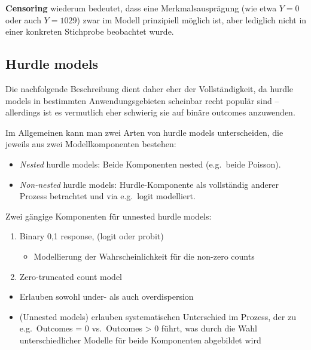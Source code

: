 \documentclass[ngerman,a4paper,]{scrartcl}
\providecommand{\tightlist}{%
  \setlength{\itemsep}{0pt}\setlength{\parskip}{0pt}}
\theoremstyle{definition}
\theoremstyle{definition}
\theoremstyle{definition}
\theoremstyle{remark}
\begin{document}
\textbf{Censoring} wiederum bedeutet, dass eine Merkmalsausprägung (wie etwa \(Y = 0\) oder auch \(Y = 1029\)) zwar im Modell prinzipiell möglich ist, aber lediglich nicht in einer konkreten Stichprobe beobachtet wurde.

\hypertarget{mod-hurdle}{%
\subsection{Hurdle models}\label{mod-hurdle}}

Die nachfolgende Beschreibung dient daher eher der Vollständigkeit, da hurdle models in bestimmten Anwendungsgebieten scheinbar recht populär sind -- allerdings ist es vermutlich eher schwierig sie auf binäre outcomes anzuwenden.

Im Allgemeinen kann man zwei Arten von hurdle models unterscheiden, die jeweils aus zwei Modellkomponenten bestehen:

\begin{itemize}
\tightlist
\item
  \emph{Nested} hurdle models: Beide Komponenten nested (e.g.~beide Poisson).
\item
  \emph{Non-nested} hurdle models: Hurdle-Komponente als vollständig anderer Prozess betrachtet und via e.g.~logit modelliert.
\end{itemize}

Zwei gängige Komponenten für unnested hurdle models:

\begin{enumerate}
\def\labelenumi{\arabic{enumi}.}
\tightlist
\item
  Binary 0,1 response, (logit oder probit)

  \begin{itemize}
  \tightlist
  \item
    Modellierung der Wahrscheinlichkeit für die non-zero counts
  \end{itemize}
\item
  Zero-truncated count model
\end{enumerate}

\begin{itemize}
\tightlist
\item
  Erlauben sowohl under- als auch overdispersion
\item
  (Unnested models) erlauben systematischen Unterschied im Prozess, der zu e.g.~Outcomes = 0 vs.~Outcomes \textgreater{} 0 führt, was durch die Wahl unterschiedlicher Modelle für beide Komponenten abgebildet wird
\end{itemize}
\end{document}
